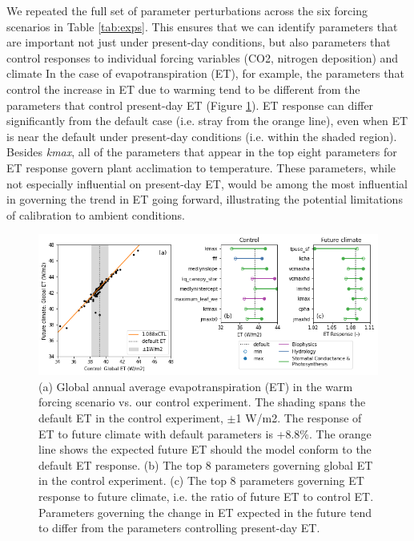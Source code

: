 \documentclass[draft]{agujournal2019}
\begin{document}
We repeated the full set of parameter perturbations across the six forcing scenarios in Table \ref{tab:exps}. This ensures that we can identify parameters that are important not just under present-day conditions, but also parameters that control responses to individual forcing variables (CO2, nitrogen deposition) and climate  In the case of evapotranspiration (ET), for example, the parameters that control the increase in ET due to warming tend to be different from the parameters that control present-day ET (Figure \ref{fig:et}). 
ET response can differ significantly from the default case (i.e. stray from the orange line), even when ET is near the default under present-day conditions (i.e. within the shaded region).
Besides \textit{kmax}, all of the parameters that appear in the top eight parameters for ET response govern plant acclimation to temperature. 
These parameters, while not especially influential on present-day ET, would be among the most influential in governing the trend in ET going forward, illustrating the potential limitations of calibration to ambient conditions.

\begin{figure}[h]
\centering
\includegraphics[width=\textwidth]{../figs/ET_response.png}
\caption{(a) Global annual average evapotranspiration (ET) in the warm forcing scenario vs. our control experiment. The shading spans the default ET in the control experiment, $\pm$1 W/m2. The response of ET to future climate with default parameters is +8.8\%. The orange line shows the expected future ET should the model conform to the default ET response. 
(b) The top 8 parameters governing global ET in the control experiment.
(c) The top 8 parameters governing ET response to future climate, i.e. the ratio of future ET to control ET.
Parameters governing the change in ET expected in the future tend to differ from the parameters controlling present-day ET.}
\label{fig:et}
\end{figure}
\end{document}

